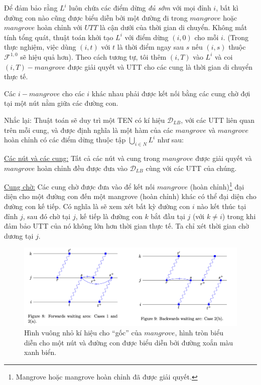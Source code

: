 \documentclass[../main.tex]{subfiles}
\begin{document}
Để đảm bảo rằng \(L^i\) luôn chứa các điểm dừng \emph{đủ sớm} với mọi
đỉnh \(i\), bất kì đường con nào cũng được biểu diễn bởi một đường đi
trong \(mangrove\) hoặc \(mangrove\) hoàn chỉnh với \(UTT\) là cận dưới
của thời gian di chuyển. Không mất tính tổng quát, thuật toán khởi tạo
\(L^i\) với điểm dừng \((i, 0)\) cho mỗi \(i\). (Trong thực nghiệm, việc
dùng \((i, t)\) với \(t\) là thời điểm ngay sau \(s\) nếu \((i, s)\)
thuộc \(\mathcal F^{1,0}\) sẽ hiệu quả hơn). Theo cách tương tự, tôi thêm
\((i, T)\) vào \(L^i\) và coi \((i, T)-mangrove\) được giải quyết và UTT
cho các cung là thời gian di chuyển thực tế.

Các \(i-mangrove\) cho các \(i\) khác nhau phải được kết nối bằng các
cung chờ đợi tại một nút nằm giữa các đường con.

Nhắc lại: Thuật toán sẽ duy trì một TEN có kí hiệu \(\mathcal D_{LB}\),
với các UTT liên quan trên mỗi cung, và được định nghĩa là một hàm của
các \(mangrove\) và \(mangrove\) hoàn chỉnh có các điểm dừng thuộc tập
\(\bigcup _{i\in N} L^i\) như sau:

\underline{Các nút và các cung:} Tất cả các nút và cung trong \(mangrove\) được giải
quyết và \(mangrove\) hoàn chỉnh đều được đưa vào \(\mathcal D_{LB}\)
cùng với các UTT của chúng.

\underline{Cung chờ:} Các cung chờ được đưa vào để kết nối \(mangrove\) (hoàn
chỉnh)\footnote{Mangrove hoặc mangrove hoàn chỉnh đã được giải quyết.}
đại diện cho một đường con đến một mangrove (hoàn chỉnh) khác có thể đại
diện cho đường con kế tiếp. Có nghĩa là sẽ xem xét bất kỳ đường con
\(i\) nào kết thúc tại đỉnh \(j\), sau đó chờ tại \(j\), kế tiếp là
đường con \(k\) bắt đầu tại \(j\) (với \(k\neq i\)) trong khi đảm bảo
UTT của nó không lớn hơn thời gian thực tế. Ta chỉ xét thời gian chờ
dương tại \(j\).


\begin{figure}
    \centering
    \includegraphics{images/Figure8_9.png} 
    \caption{Hình vuông nhỏ kí hiệu cho ``gốc'' của \(mangrove\), hình
tròn biểu diễn cho một nút và đường con được biểu diễn bởi đường xoắn
màu xanh biển.}
    \label{fig:8_9}
\end{figure}
\end{document}

